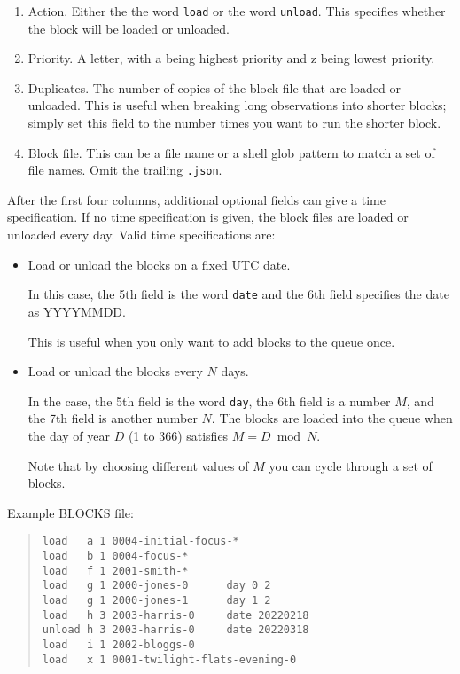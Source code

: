 \begin{enumerate}
\item Action. Either the the word \verb|load| or the word \verb|unload|. This specifies whether the block will be loaded or unloaded.
\item Priority. A letter, with a being highest priority and z being lowest
priority.
\item  Duplicates. The number of copies of the block file that are loaded or unloaded. This is useful when breaking long observations into shorter blocks; simply set this field to the number times you want to run the shorter block.

\item Block file. This can be a file name or a shell glob pattern to match a set
of file names. Omit the trailing \verb|.json|.
\end{enumerate}

After the first four columns, additional optional fields can give a time specification. If no time specification is given, the block files are loaded or unloaded
every day. Valid time specifications are:

\begin{itemize}
    \item Load or unload the blocks on a fixed UTC date. 
    
    In this case, the 5th field is the word \verb|date| and the 6th field specifies the date as YYYYMMDD.
    
    This is useful when you only want to add blocks to the queue once.
    
    \item Load or unload the blocks every $N$ days. 
    
    In the case, the 5th field is the word \verb|day|, the 6th field is a number $M$, and the 7th field is another number $N$. The blocks are loaded into the queue when the day of year $D$ (1 to 366) satisfies $M = D \bmod N$.
    
    Note that by choosing different values of $M$ you can cycle through a set of blocks.
    
\end{itemize}

Example BLOCKS file:

\begin{quote}
\begin{verbatim}
load   a 1 0004-initial-focus-*
load   b 1 0004-focus-*
load   f 1 2001-smith-*
load   g 1 2000-jones-0      day 0 2
load   g 1 2000-jones-1      day 1 2
load   h 3 2003-harris-0     date 20220218
unload h 3 2003-harris-0     date 20220318
load   i 1 2002-bloggs-0
load   x 1 0001-twilight-flats-evening-0
\end{verbatim}
\end{quote}
